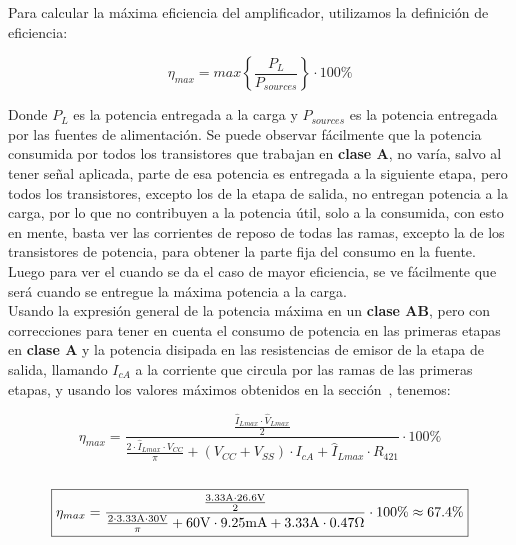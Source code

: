\vspace{1.5cm}

Para calcular la máxima eficiencia del amplificador, utilizamos la definición de eficiencia:

\begin{equation}
\eta_{max} = max\left\{ \frac{P_{L}}{P_{sources}} \right\} \cdot 100\%
\end{equation}

Donde $P_{L}$ es la potencia entregada a la carga y $P_{sources}$ es la potencia entregada por las fuentes de alimentación. Se puede observar fácilmente que la potencia consumida por todos los transistores que trabajan en \textbf{clase A}, no varía, salvo al tener señal aplicada, parte de esa potencia es entregada a la siguiente etapa, pero todos los transistores, excepto los de la etapa de salida, no entregan potencia a la carga, por lo que no contribuyen a la potencia útil, solo a la consumida, con esto en mente, basta ver las corrientes de reposo de todas las ramas, excepto la de los transistores de potencia, para obtener la parte fija del consumo en la fuente. Luego para ver el cuando se da el caso de mayor eficiencia, se ve fácilmente que será cuando se entregue la máxima potencia a la carga.\\


Usando la expresión general de la potencia máxima en un \textbf{clase AB}, pero con correcciones para tener en cuenta el consumo de potencia en las primeras etapas en \textbf{clase A} y la potencia disipada en las resistencias de emisor de la etapa de salida, llamando $I_{cA}$ a la corriente que circula por las ramas de las primeras etapas, y usando los valores máximos obtenidos en la sección~, tenemos:


\begin{equation*}
\eta_{max} = \frac{ \frac{ \hat{I}_{L{max}} \cdot \hat{V}_{L{max}} }{2}   }{  \frac{ 2 \cdot \hat{I}_{L{max}} \cdot V_{CC}  }{ \pi } + \left( V_{CC} + V_{SS} \right) \cdot I_{cA} + \hat{I}_{L{max}} \cdot R_{421}  } \cdot 100\%
\end{equation*}\\


\begin{equation}
\boxed{ \eta_{max} = \frac{ \frac{ 3.33 \si[per-mode=symbol]{\ampere}  \cdot 26.6 \si[per-mode=symbol]{\volt} }{2}   }{  \frac{ 2 \cdot  3.33 \si[per-mode=symbol]{\ampere} \cdot 30 \si[per-mode=symbol]{\volt}  }{ \pi } + 60 \si[per-mode=symbol]{\volt} \cdot 9.25 \si[per-mode=symbol]{\milli\ampere} + 3.33 \si[per-mode=symbol]{\ampere} \cdot 0.47 \si[per-mode=symbol]{\ohm}  } \cdot 100\% \approx 67.4 \% }
\end{equation}




\vfill

\clearpage

